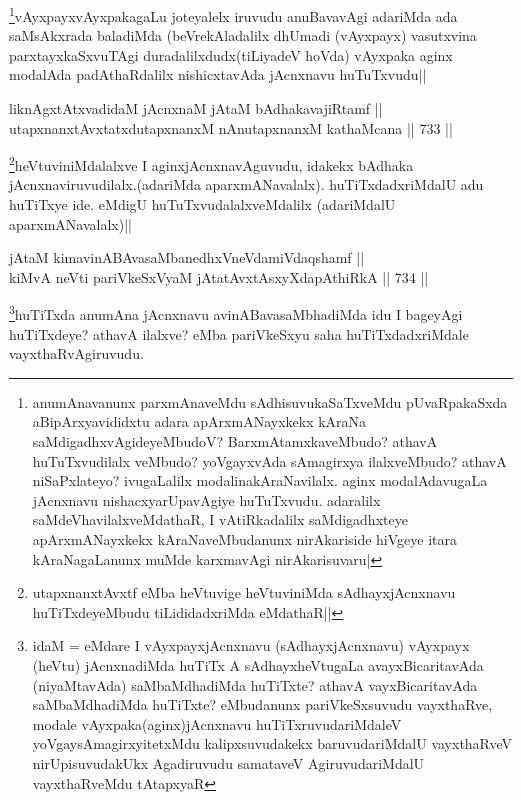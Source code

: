 \begin{artha}
\footnote{anumAnavanunx parxmAnaveMdu sAdhisuvukaSaTxveMdu pUvaRpakaSxda aBipArxyavididxtu adara apArxmANayxkekx kAraNa saMdigadhxvAgideyeMbudoV? BarxmAtamxkaveMbudo? athavA huTuTxvudilalx veMbudo? yoVgayxvAda sAmagirxya ilalxveMbudo? athavA niSaPxlateyo? ivugaLalilx modalinakAraNavilalx. aginx modalAdavugaLa jAcnxnavu nishacxyarUpavAgiye huTuTxvudu. adaralilx saMdeVhavilalxveMdathaR, I vAtiRkadalilx saMdigadhxteye apArxmANayxkekx kAraNaveMbudanunx nirAkariside hiVgeye itara kAraNagaLanunx muMde karxmavAgi nirAkarisuvaru|}vAyxpayxvAyxpakagaLu joteyalelx iruvudu anuBavavAgi adariMda ada saMsAkxrada baladiMda (beVrekAladalilx dhUmadi (vAyxpayx) vasutxvina parxtayxkaSxvuTAgi duradalilxdudx(tiLiyadeV hoVda) vAyxpaka aginx modalAda padAthaRdalilx nishicxtavAda jAcnxnavu huTuTxvudu||
\end{artha}

\begin{shl}
liknAgxtAtxvadidaM jAcnxnaM jAtaM bAdhakavajiRtamf || \\
utapxnanxtAvxtatxdutapxnanxM nAnutapxnanxM kathaMcana ||  733 ||  
\end{shl}

\begin{artha}
\footnote{utapxnanxtAvxtf eMba heVtuvige heVtuviniMda sAdhayxjAcnxnavu huTiTxdeyeMbudu tiLididadxriMda eMdathaR||}heVtuviniMdalalxve  I aginxjAcnxnavAguvudu, idakekx bAdhaka jAcnxnaviruvudilalx.(adariMda aparxmANavalalx). huTiTxdadxriMdalU adu huTiTxye ide. eMdigU huTuTxvudalalxveMdalilx (adariMdalU aparxmANavalalx)||
\end{artha}


\begin{shl}
jAtaM kimavinABAvasaMbanedhxVneVdamiVdaqshamf || \\
kiMvA neVti pariVkeSxVyaM jAtatAvxtAsxyXdapAthiRkA ||  734 ||  
\end{shl}

\begin{artha}
\footnote{idaM = eMdare I vAyxpayxjAcnxnavu (sAdhayxjAcnxnavu) vAyxpayx (heVtu) jAcnxnadiMda huTiTx A sAdhayxheVtugaLa avayxBicaritavAda (niyaMtavAda) saMbaMdhadiMda huTiTxte? athavA vayxBicaritavAda saMbaMdhadiMda huTiTxte? eMbudanunx pariVkeSxsuvudu vayxthaRve, modale vAyxpaka(aginx)jAcnxnavu huTiTxruvudariMdaleV yoVgaysAmagirxyitetxMdu kalipxsuvudakekx baruvudariMdalU vayxthaRveV nirUpisuvudakUkx Agadiruvudu samataveV AgiruvudariMdalU vayxthaRveMdu tAtapxyaR}huTiTxda anumAna jAcnxnavu avinABavasaMbhadiMda idu I bageyAgi huTiTxdeye? athavA ilalxve? eMba pariVkeSxyu saha huTiTxdadxriMdale vayxthaRvAgiruvudu.
\end{artha}


